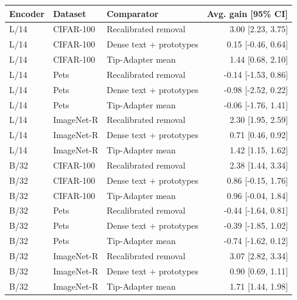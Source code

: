 \begin{tabular}{lllr}
\toprule
Encoder & Dataset & Comparator & Avg. gain [95\% CI] \\
\midrule
L/14 & CIFAR-100 & Recalibrated removal & 3.00 [2.23, 3.75] \\
L/14 & CIFAR-100 & Dense text + prototypes & 0.15 [-0.46, 0.64] \\
L/14 & CIFAR-100 & Tip-Adapter mean & 1.44 [0.68, 2.10] \\
L/14 & Pets & Recalibrated removal & -0.14 [-1.53, 0.86] \\
L/14 & Pets & Dense text + prototypes & -0.98 [-2.52, 0.22] \\
L/14 & Pets & Tip-Adapter mean & -0.06 [-1.76, 1.41] \\
L/14 & ImageNet-R & Recalibrated removal & 2.30 [1.95, 2.59] \\
L/14 & ImageNet-R & Dense text + prototypes & 0.71 [0.46, 0.92] \\
L/14 & ImageNet-R & Tip-Adapter mean & 1.42 [1.15, 1.62] \\
\midrule
B/32 & CIFAR-100 & Recalibrated removal & 2.38 [1.44, 3.34] \\
B/32 & CIFAR-100 & Dense text + prototypes & 0.86 [-0.15, 1.76] \\
B/32 & CIFAR-100 & Tip-Adapter mean & 0.96 [-0.04, 1.84] \\
B/32 & Pets & Recalibrated removal & -0.44 [-1.64, 0.81] \\
B/32 & Pets & Dense text + prototypes & -0.39 [-1.85, 1.02] \\
B/32 & Pets & Tip-Adapter mean & -0.74 [-1.62, 0.12] \\
B/32 & ImageNet-R & Recalibrated removal & 3.07 [2.82, 3.34] \\
B/32 & ImageNet-R & Dense text + prototypes & 0.90 [0.69, 1.11] \\
B/32 & ImageNet-R & Tip-Adapter mean & 1.71 [1.44, 1.98] \\
\bottomrule
\end{tabular}
